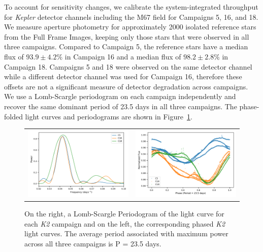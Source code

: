 \documentclass[trackchanges]{aastex631}
\begin{document}
To account for sensitivity changes, we calibrate the system-integrated throughput for \emph{Kepler} detector channels including the M67 field for Campaigns 5, 16, and 18. We measure aperture photometry for approximately 2000 isolated reference stars from the Full Frame Images, keeping only those stars that were observed in all three campaigns. Compared to Campaign 5, the reference stars have a median flux of $93.9\pm4.2\%$ in Campaign 16 and a median flux of $98.2\pm2.8\%$ in Campaign 18. Campaigns 5 and 18 were observed on the same detector channel while a different detector channel was used for Campaign 16, therefore these offsets are not a significant measure of detector degradation across campaigns. We use a Lomb-Scargle periodogram on each campaign independently and recover the same dominant period of 23.5 days in all three campaigns. The phase-folded light curves and periodograms are shown in Figure~\ref{fig:periodogram}.



\begin{figure}[ht]
    \centering
    \begin{tabular}{cc}
      \includegraphics[width=3in]{figures/AllCampaigns_Periodogram.pdf}   & \includegraphics[width=3in]{figures/AllCampaigns_Phased_Lightcurve.pdf}  \\
    \end{tabular}
    \caption{On the right, a Lomb-Scargle Periodogram of the light curve for each \emph{K2} campaign and on the left, the corresponding phased \emph{K2} light curves. The average period associated with maximum power across all three campaigns is P = 23.5 days.  }
    \label{fig:periodogram}
\end{figure}
\end{document}
